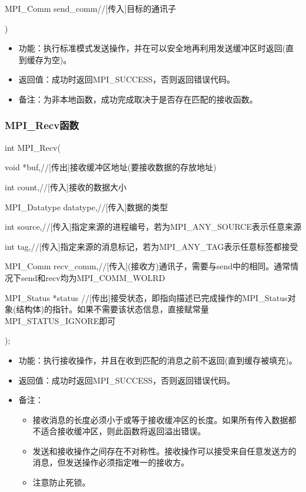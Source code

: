 \documentclass[UTF8]{article}%
\begin{document}
    \qquad MPI\_Comm send\_comm//[传入]目标的通讯子
    
    )

\begin{itemize}
    \item 功能：执行标准模式发送操作，并在可以安全地再利用发送缓冲区时返回(直到缓存为空)。
    \item 返回值：成功时返回MPI\_SUCCESS，否则返回错误代码。
    \item 备注：为非本地函数，成功完成取决于是否存在匹配的接收函数。
\end{itemize}

\subsubsection{MPI\_Recv函数}

int MPI\_Recv(

    \qquad void            *buf,//[传出]接收缓冲区地址(要接收数据的存放地址)

    \qquad int             count,//[传入]接收的数据大小

    \qquad MPI\_Datatype   datatype,//[传入]数据的类型

    \qquad int             source,//[传入]指定来源的进程编号，若为MPI\_ANY\_SOURCE表示任意来源

    \qquad int             tag,//[传入]指定来源的消息标记，若为MPI\_ANY\_TAG表示任意标签都接受

    \qquad MPI\_Comm       recv\_comm,//[传入](接收方)通讯子，需要与send中的相同。通常情况下send和recv均为MPI\_COMM\_WOLRD

    \qquad MPI\_Status      *status //[传出]接受状态，即指向描述已完成操作的MPI\_Status对象(结构体)的指针。如果不需要该状态信息，直接赋常量MPI\_STATUS\_IGNORE即可

);

\begin{itemize}
    \item 功能：执行接收操作，并且在收到匹配的消息之前不返回(直到缓存被填充)。
    \item 返回值：成功时返回MPI\_SUCCESS，否则返回错误代码。
    \item 备注：
    
    {
        \begin{itemize}
            \item 接收消息的长度必须小于或等于接收缓冲区的长度。如果所有传入数据都不适合接收缓冲区，则此函数将返回溢出错误。
            \item 发送和接收操作之间存在不对称性。接收操作可以接受来自任意发送方的消息，但发送操作必须指定唯一的接收方。
            \item 注意防止死锁。
        \end{itemize}
    }

\end{itemize}
\end{document}
